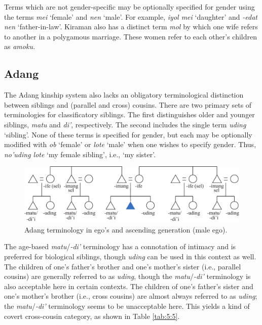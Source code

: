 Terms which are not gender-specific may be optionally specified for gender using the terms \textit{mei} `female' and \textit{nen} `male'. For example, \textit{iyol mei} `daughter' and \textit{{}-edat nen} `father-in-law'. Kiraman also has a distinct term \textit{mol} by which one wife refers to another in a polygamous marriage. These women refer to each other's children as \textit{amoku.} 

\subsection{Adang}\label{sect_adang}
The Adang kinship system also lacks an obligatory terminological distinction between siblings and (parallel and cross) cousins. There are two primary sets of terminologies for classificatory siblings. The first distinguishes older and younger siblings, \textit{matu} and \textit{di'}, respectively. The second includes the single term \textit{uding} `sibling'. None of these terms is specified for gender, but each may be optionally modified with \textit{ob} `female' or \textit{lote} `male' when one wishes to specify gender. Thus, \textit{no'uding lote} `my female sibling', i.e., `my sister'. 

\begin{figure}
 \includegraphics[width=\textwidth]{figures/Holton_ch5_fig9.pdf}
\caption{Adang terminology in ego's and ascending generation (male ego). }
\end{figure}  

The age-based \textit{matu}/\textit{{}-di'} terminology has a connotation of intimacy and is preferred for biological siblings, though \textit{uding} can be used in this context as well. The children of one's father's brother and one's mother's sister (i.e., parallel cousins) are generally referred to as \textit{uding}, though the \textit{matu}/\textit{{}-di'} terminology is also acceptable here in certain contexts. The children of one's father's sister and one's mother's brother (i.e., cross cousins) are almost always referred to as \textit{uding}; the \textit{matu}/\textit{{}-di'} terminology seems to be unacceptable here. This yields a kind of covert cross-cousin category, as shown in Table \ref{tab:5:5}. 




